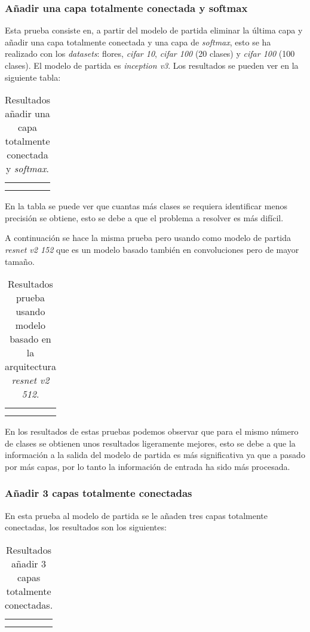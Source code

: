 \documentclass[12pt,a4paper]{article}
\begin{document}
\subsubsection{Añadir una capa totalmente conectada y softmax}
Esta prueba consiste en, a partir del modelo de partida eliminar la última capa y añadir una capa totalmente conectada y una capa de \textit{softmax}, esto se ha realizado con los \textit{datasets}: flores, \textit{cifar 10}, \textit{cifar 100} (20 clases) y \textit{cifar 100} (100 clases). El modelo de partida es \textit{inception v3}. Los resultados se pueden ver en la siguiente tabla:
\begin{table}[H]
\centering
\begin{tabular}{|l|l|l|}
\hline
 &  &  \\ \hline
 &  &  \\ \hline
 &  &  \\ \hline
\end{tabular}
\caption{Resultados añadir una capa totalmente conectada y \textit{softmax}.}
\end{table}

En la tabla se puede ver que cuantas más clases se requiera identificar menos precisión se obtiene, esto se debe a que el problema a resolver es más difícil.
\bigskip

A continuación se hace la misma prueba pero usando como modelo de partida \textit{resnet v2 152} que es un modelo basado también en convoluciones pero de mayor tamaño.
\begin{table}[H]
\centering
\begin{tabular}{|l|l|l|}
\hline
 &  &  \\ \hline
 &  &  \\ \hline
 &  &  \\ \hline
\end{tabular}
\caption{Resultados prueba usando modelo basado en la arquitectura \textit{resnet v2 512}.}
\end{table}

En los resultados de estas pruebas podemos observar que para el mismo número de clases se obtienen unos resultados ligeramente mejores, esto se debe a que la información a la salida del modelo de partida es más significativa ya que a pasado por más capas, por lo tanto la información de entrada ha sido más procesada.

\subsubsection{Añadir 3 capas totalmente conectadas}
En esta prueba al modelo de partida se le añaden tres capas totalmente conectadas, los resultados son los siguientes:
\begin{table}[H]
\centering
\begin{tabular}{|l|l|l|}
\hline
 &  &  \\ \hline
 &  &  \\ \hline
 &  &  \\ \hline
\end{tabular}
\caption{Resultados añadir 3 capas totalmente conectadas.}
\end{table}
\end{document}
